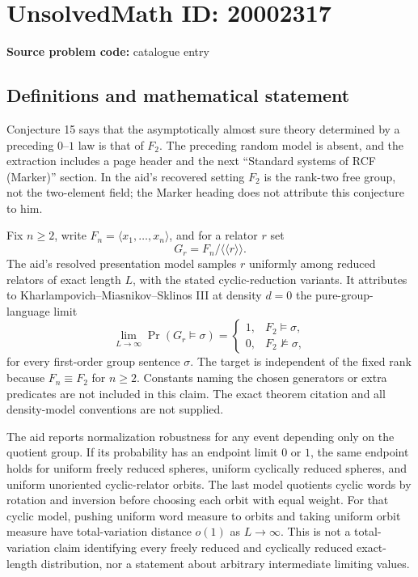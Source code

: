 \documentclass[11pt]{article}
\begin{document}
\section*{UnsolvedMath ID: 20002317}
\textbf{Source problem code:} catalogue entry
\subsection{Definitions and mathematical statement}
Conjecture 15 says that the asymptotically almost sure theory determined by a preceding \(0\)--\(1\) law is that of \(F_2\). The preceding random model is absent, and the extraction includes a page header and the next ``Standard systems of RCF (Marker)'' section. In the aid's recovered setting \(F_2\) is the rank-two free group, not the two-element field; the Marker heading does not attribute this conjecture to him.

Fix \(n\ge2\), write \(F_n=\langle x_1,\ldots,x_n\rangle\), and for a relator \(r\) set
\[
 G_r=F_n/\langle\!\langle r\rangle\!\rangle.
\]
The aid's resolved presentation model samples \(r\) uniformly among reduced relators of exact length \(L\), with the stated cyclic-reduction variants. It attributes to Kharlampovich--Miasnikov--Sklinos III at density \(d=0\) the pure-group-language limit
\[
 \lim_{L\to\infty}\Pr(G_r\models\sigma)=
 \begin{cases}1,&F_2\models\sigma,\\0,&F_2\not\models\sigma,\end{cases}
\]
for every first-order group sentence \(\sigma\). The target is independent of the fixed rank because \(F_n\equiv F_2\) for \(n\ge2\). Constants naming the chosen generators or extra predicates are not included in this claim. The exact theorem citation and all density-model conventions are not supplied.

The aid reports normalization robustness for any event depending only on the quotient group. If its probability has an endpoint limit \(0\) or \(1\), the same endpoint holds for uniform freely reduced spheres, uniform cyclically reduced spheres, and uniform unoriented cyclic-relator orbits. The last model quotients cyclic words by rotation and inversion before choosing each orbit with equal weight. For that cyclic model, pushing uniform word measure to orbits and taking uniform orbit measure have total-variation distance \(o(1)\) as \(L\to\infty\). This is not a total-variation claim identifying every freely reduced and cyclically reduced exact-length distribution, nor a statement about arbitrary intermediate limiting values.
\end{document}
